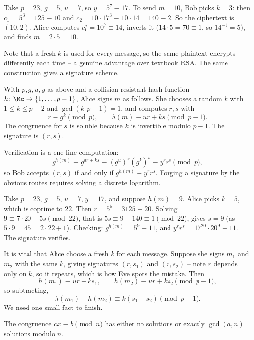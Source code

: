 \begin{example}
	Take $p = 23$, $g = 5$, $u = 7$, so $y = 5^7 \equiv 17$. To send $m = 10$, Bob picks $k = 3$: then $c_1 = 5^3 = 125\equiv10$ and $c_2 = 10\cdot17^3 \equiv 10\cdot14 = 140\equiv2$. So the ciphertext is $(10,2)$. Alice computes $c_1^u = 10^7\equiv14$, inverts it ($14\cdot5 = 70\equiv1$, so $14^{-1}=5$), and finds $m = 2\cdot5 = 10$. 
\end{example}

Note that a fresh $k$ is used for every message, so the same plaintext encrypts differently each time -- a genuine advantage over textbook RSA. The same construction gives a signature scheme.

\begin{definition}
	With $p,g,u,y$ as above and a collision-resistant hash function $h\colon\Mc\to\{1,\dots,p-1\}$, Alice signs $m$ as follows. She chooses a random $k$ with $1\le k\le p-2$ and $\gcd(k,p-1)=1$, and computes $r,s$ with
	$$r \equiv g^k \pmod p, \qquad h(m)\equiv ur+ks \pmod{p-1}.$$
	The congruence for $s$ is soluble because $k$ is invertible modulo $p-1$. The signature is $(r,s)$.
\end{definition}

Verification is a one-line computation:
$$g^{h(m)} \equiv g^{ur+ks} \equiv (g^u)^r(g^k)^s \equiv y^rr^s\pmod p,$$
so Bob accepts $(r,s)$ if and only if $g^{h(m)}\equiv y^rr^s$. Forging a signature by the obvious routes requires solving a discrete logarithm.

\begin{example}
	Take $p = 23$, $g = 5$, $u = 7$, $y = 17$, and suppose $h(m) = 9$. Alice picks $k = 5$, which is coprime to $22$. Then $r = 5^5 = 3125 \equiv 20$. Solving $9 \equiv 7\cdot20+5s \pmod{22}$, that is $5s \equiv 9 - 140 \equiv 1 \pmod{22}$, gives $s = 9$ (as $5\cdot9 = 45 = 2\cdot22+1$). Checking: $g^{h(m)} = 5^9 \equiv 11$, and $y^rr^s = 17^{20}\cdot20^9\equiv11$. The signature verifies.
\end{example}

It is vital that Alice choose a fresh $k$ for each message. Suppose she signs $m_1$ and $m_2$ with the same $k$, giving signatures $(r,s_1)$ and $(r,s_2)$ -- note $r$ depends only on $k$, so it repeats, which is how Eve spots the mistake. Then
$$h(m_1)\equiv ur+ks_1, \qquad h(m_2)\equiv ur+ks_2 \pmod{p-1},$$
so subtracting,
$$h(m_1)-h(m_2)\equiv k(s_1-s_2)\pmod{p-1}.$$
We need one small fact to finish.

\begin{lemma}\label{lem:lincong}
	The congruence $ax\equiv b\pmod n$ has either no solutions or exactly $\gcd(a,n)$ solutions modulo $n$.
\end{lemma}


